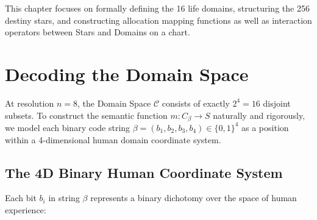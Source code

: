\documentclass[a4paper,14pt, twoside]{memoir}
\begin{document}
This chapter focuses on formally defining the 16 life domains, structuring the 256 destiny stars, and constructing allocation mapping functions as well as interaction operators between Stars and Domains on a chart.

\section{Decoding the Domain Space}

At resolution $n=8$, the Domain Space $\mathcal{C}$ consists of exactly $2^4 = 16$ disjoint subsets. To construct the semantic function $m: C_\beta \rightarrow S$ naturally and rigorously, we model each binary code string $\beta = (b_1, b_2, b_3, b_4) \in \{0,1\}^4$ as a position within a 4-dimensional human domain coordinate system.

\subsection{The 4D Binary Human Coordinate System}

Each bit $b_i$ in string $\beta$ represents a binary dichotomy over the space of human experience:
\end{document}
